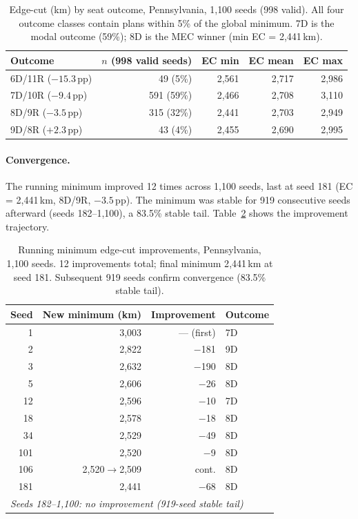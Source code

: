 \begin{table}[h]
\centering
\begin{tabular}{lrrrr}
\toprule
Outcome & $n$ (998 valid seeds) & EC min & EC mean & EC max \\
\midrule
6D/11R ($-15.3$\,pp) & 49  (5\%) & 2{,}561 & 2{,}717 & 2{,}986 \\
7D/10R ($-9.4$\,pp)  & 591 (59\%) & 2{,}466 & 2{,}708 & 3{,}110 \\
8D/9R  ($-3.5$\,pp)  & 315 (32\%) & 2{,}441 & 2{,}703 & 2{,}949 \\
9D/8R  ($+2.3$\,pp)  & 43  (4\%) & 2{,}455 & 2{,}690 & 2{,}995 \\
\bottomrule
\end{tabular}
\caption{Edge-cut (km) by seat outcome, Pennsylvania, 1{,}100 seeds (998 valid).
  All four outcome classes contain plans within 5\% of the global minimum.
  7D is the modal outcome (59\%); 8D is the MEC winner (min EC = 2{,}441\,km).}
\label{tab:pa-ec-by-outcome}
\end{table}

\paragraph{Convergence.}
The running minimum improved 12 times across 1{,}100 seeds, last at seed 181
(EC = 2{,}441\,km, 8D/9R, $-3.5$\,pp). The minimum was stable for 919
consecutive seeds afterward (seeds 182--1{,}100), a 83.5\% stable tail.
Table~\ref{tab:pa-convergence} shows the improvement trajectory.

\begin{table}[h]
\centering
\begin{tabular}{rrrl}
\toprule
Seed & New minimum (km) & Improvement & Outcome \\
\midrule
1   & 3{,}003 & --- (first) & 7D \\
2   & 2{,}822 & $-$181     & 9D \\
3   & 2{,}632 & $-$190     & 8D \\
5   & 2{,}606 & $-$26      & 8D \\
12  & 2{,}596 & $-$10      & 7D \\
18  & 2{,}578 & $-$18      & 8D \\
34  & 2{,}529 & $-$49      & 8D \\
101 & 2{,}520 & $-$9       & 8D \\
106 & 2{,}520$\to$2{,}509 & cont. & 8D \\
181 & 2{,}441 & $-$68      & 8D \\
\midrule
\multicolumn{4}{l}{\emph{Seeds 182--1{,}100: no improvement (919-seed stable tail)}} \\
\bottomrule
\end{tabular}
\caption{Running minimum edge-cut improvements, Pennsylvania, 1{,}100 seeds.
  12 improvements total; final minimum 2{,}441\,km at seed 181.
  Subsequent 919 seeds confirm convergence (83.5\% stable tail).}
\label{tab:pa-convergence}
\end{table}

